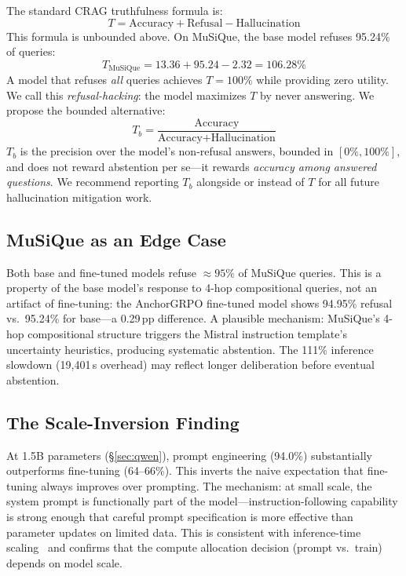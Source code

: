 \documentclass[11pt]{article}
\begin{document}
The standard CRAG truthfulness formula is:
\begin{equation}
T = \text{Accuracy} + \text{Refusal} - \text{Hallucination}
\label{eq:t}
\end{equation}
This formula is unbounded above. On MuSiQue, the base model refuses 95.24\% of queries:
\begin{equation*}
T_{\text{MuSiQue}} = 13.36 + 95.24 - 2.32 = 106.28\%
\end{equation*}
A model that refuses \emph{all} queries achieves $T = 100\%$ while providing zero utility. We call this \emph{refusal-hacking}: the model maximizes $T$ by never answering. We propose the bounded alternative:
\begin{equation}
T_b = \frac{\text{Accuracy}}{\text{Accuracy} + \text{Hallucination}}
\label{eq:tb}
\end{equation}
$T_b$ is the precision over the model's non-refusal answers, bounded in $[0\%, 100\%]$, and does not reward abstention per se---it rewards \emph{accuracy among answered questions}. We recommend reporting $T_b$ alongside or instead of $T$ for all future hallucination mitigation work.

\subsection{MuSiQue as an Edge Case}
\label{sec:musique}

Both base and fine-tuned models refuse $\approx95\%$ of MuSiQue queries. This is a property of the base model's response to 4-hop compositional queries, not an artifact of fine-tuning: the AnchorGRPO fine-tuned model shows 94.95\% refusal vs.\ 95.24\% for base---a 0.29\,pp difference. A plausible mechanism: MuSiQue's 4-hop compositional structure triggers the Mistral instruction template's uncertainty heuristics, producing systematic abstention. The 111\% inference slowdown (19{,}401\,s overhead) may reflect longer deliberation before eventual abstention.

\subsection{The Scale-Inversion Finding}

At 1.5B parameters (\S\ref{sec:qwen}), prompt engineering (94.0\%) substantially outperforms fine-tuning (64--66\%). This inverts the naive expectation that fine-tuning always improves over prompting. The mechanism: at small scale, the system prompt is functionally part of the model---instruction-following capability is strong enough that careful prompt specification is more effective than parameter updates on limited data. This is consistent with inference-time scaling~\cite{schick2023toolformer} and confirms that the compute allocation decision (prompt vs.\ train) depends on model scale.
\end{document}
